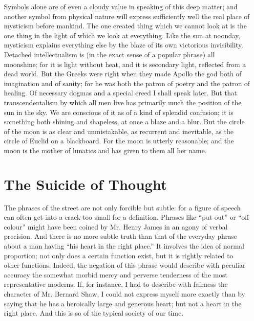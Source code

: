 \documentclass{book}
\begin{document}
Symbols alone are of even a cloudy value in speaking of this deep matter; and another symbol from physical nature will express sufficiently well the real place of mysticism before mankind. The one created thing which we cannot look at is the one thing in the light of which we look at everything. Like the sun at noonday, mysticism explains everything else by the blaze of its own victorious invisibility. Detached intellectualism is (in the exact sense of a popular phrase) all moonshine; for it is light without heat, and it is secondary light, reflected from a dead world. But the Greeks were right when they made Apollo the god both of imagination and of sanity; for he was both the patron of poetry and the patron of healing. Of necessary dogmas and a special creed I shall speak later. But that transcendentalism by which all men live has primarily much the position of the sun in the sky. We are conscious of it as of a kind of splendid confusion; it is something both shining and shapeless, at once a blaze and a blur. But the circle of the moon is as clear and unmistakable, as recurrent and inevitable, as the circle of Euclid on a blackboard. For the moon is utterly reasonable; and the moon is the mother of lunatics and has given to them all her name.

\chapter{The Suicide of Thought}
\label{chapter-2}
The phrases of the street are not only forcible but subtle: for a figure of speech can often get into a crack too small for a definition. Phrases like “put out” or “off colour” might have been coined by Mr. Henry James in an agony of verbal precision. And there is no more subtle truth than that of the everyday phrase about a man having “his heart in the right place.” It involves the idea of normal proportion; not only does a certain function exist, but it is rightly related to other functions. Indeed, the negation of this phrase would describe with peculiar accuracy the somewhat morbid mercy and perverse tenderness of the most representative moderns. If, for instance, I had to describe with fairness the character of Mr. Bernard Shaw, I could not express myself more exactly than by saying that he has a heroically large and generous heart; but not a heart in the right place. And this is so of the typical society of our time.
\end{document}
